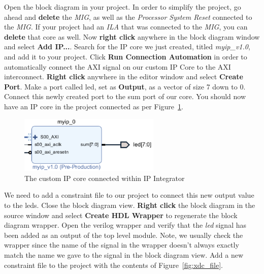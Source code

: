 \documentclass[11pt]{article}
\begin{document}
Open the block diagram in your project. In order to simplify the project, go ahead and \textbf{delete} the \textit{MIG}, as well as the \textit{Processor System Reset} connected to the \textit{MIG}. If your project had an \textit{ILA} that was connected to the \textit{MIG}, you can \textbf{delete} that core as well. Now \textbf{right click} anywhere in the block diagram window and select \textbf{Add IP...}. Search for the IP core we just created, titled \textit{myip\_v1.0}, and add it to your project. Click \textbf{Run Connection Automation} in order to automatically connect the AXI signal on our custom IP Core to the AXI interconnect. \textbf{Right click} anywhere in the editor window and select \textbf{Create Port}. Make a port called led, set as \textbf{Output}, as a vector of size 7 down to 0. Connect this newly created port to the sum port of our core. You should now have an IP core in the project connected as per Figure~\ref{fig:block_w_core}. 

\begin{figure}[!h]
    \centering
    \includegraphics[width=0.6\textwidth]{images/block_w_core.png}
    \caption{The custom IP core connected within IP Integrator}
    \label{fig:block_w_core}
\end{figure}

We need to add a constraint file to our project to connect this new output value to the leds. Close the block diagram view. \textbf{Right click} the block diagram in the source window and select \textbf{Create HDL Wrapper} to regenerate the block diagram wrapper. Open the verilog wrapper and verify that the \textit{led} signal has been added as an output of the top level module. Note, we usually check the wrapper since the name of the signal in the wrapper doesn't always exactly match the name we gave to the signal in the block diagram view. Add a new constraint file to the project with the contents of Figure~\ref{fig:xdc_file}.
\end{document}
